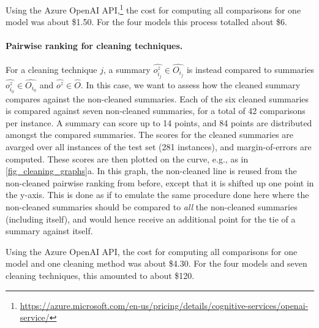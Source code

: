 Using the Azure OpenAI API,\footnote{\url{https://azure.microsoft.com/en-us/pricing/details/cognitive-services/openai-service/}} the cost for computing all comparisons for one model was about \$1.50. For the four models this process totalled about \$6.

\paragraph{Pairwise ranking for cleaning techniques.}
For a cleaning technique $j$, a summary $\widehat{o_{i_j}^z} \in \widehat{O_{i_j}}$ is instead compared to summaries $\widehat{o_{i_0}^z} \in \widehat{O_{i_0}}$ and $\widehat{o^z} \in \widehat{O}$. In this case, we want to assess how the cleaned summary compares against the non-cleaned summaries. Each of the six cleaned summaries is compared against seven non-cleaned summaries, for a total of 42 comparisons per instance. A summary can score up to 14 points, and 84 points are distributed amongst the compared summaries. The scores for the cleaned summaries are avarged over all instances of the test set (281 instances), and margin-of-errors are computed. These scores are then plotted on the curve, e.g., as in \autoref{fig_cleaning_graphs}a. In this graph, the non-cleaned line is reused from the non-cleaned pairwise ranking from before, except that it is shifted up one point in the y-axis. This is done as if to emulate the same procedure done here where the non-cleaned summaries should be compared to \textit{all} the non-cleaned summaries (including itself), and would hence receive an additional point for the tie of a summary against itself.

Using the Azure OpenAI API, the cost for computing all comparisons for one model and one cleaning method was about \$4.30. For the four models and seven cleaning techniques, this amounted to about \$120.






